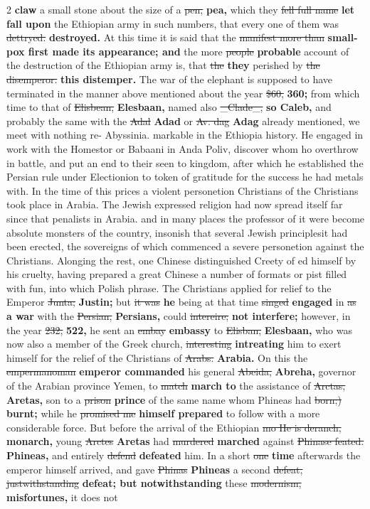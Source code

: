 \documentclass[10pt]{article}
\begin{document}
\begin{multicols}{2}
\textbf{claw} a small stone about the size of a \sout{pen,} \textbf{pea,} which they \sout{fell full name} \textbf{let fall upon} the Ethiopian army in such numbers, that every one of them was \sout{dettryed.} \textbf{destroyed.} At this time it is said that the \sout{manifest more than} \textbf{small-pox first made its appearance; and} the more \sout{people} \textbf{probable} account of the destruction of the Ethiopian army is, that \sout{the} \textbf{they} perished by \sout{the disemperor.} \textbf{this distemper.} The war of the elephant is supposed to have terminated in the manner above mentioned about the year \sout{\$60,} \textbf{360;} from which time to that of \sout{Elisbean,} \textbf{Elesbaan,} named also \sout{\_Clade\_,} \textbf{so Caleb,} and probably the same with the \sout{Adal} \textbf{Adad} or \sout{Av. dag} \textbf{Adag} already mentioned, we meet with nothing re- Abyssinia. markable in the Ethiopia history. He engaged in work with the Homestor or Babaani in Anda Poliv, discover whom ho overthrow in battle, and put an end to their seen to kingdom, after which he established the Persian rule under Electionion to token of gratitude for the success he had metals with. In the time of this prices a violent personetion Christians of the Christians took place in Arabia. The Jewish expressed religion had now spread itself far since that penalists in Arabia. and in many places the professor of it were become absolute monsters of the country, insonish that several Jewish principlesit had been erected, the sovereigns of which commenced a severe personetion against the Christians. Alonging the rest, one Chinese distinguished Creety of ed himself by his cruelty, having prepared a great Chinese a number of formats or pist filled with fun, into which Polish phrase. The Christians applied for relief to the Emperor \sout{Junta;} \textbf{Justin;} but \sout{it was} \textbf{he} being at that time \sout{singed} \textbf{engaged} in \sout{as} \textbf{a war} with the \sout{Persian,} \textbf{Persians,} could \sout{intereire;} \textbf{not interfere;} however, in the year \sout{232,} \textbf{522,} he sent an \sout{embay} \textbf{embassy} to \sout{Elisban,} \textbf{Elesbaan,} who was now also a member of the Greek church, \sout{interesting} \textbf{intreating} him to exert himself for the relief of the Christians of \sout{Arabs.} \textbf{Arabia.} On this the \sout{empermanoman} \textbf{emperor commanded} his general \sout{Abeida,} \textbf{Abreha,} governor of the Arabian province Yemen, to \sout{match} \textbf{march to} the assistance of \sout{Arctas,} \textbf{Aretas,} son to a \sout{prison} \textbf{prince} of the same name whom Phineas had \sout{born;)} \textbf{burnt;} while he \sout{promised me} \textbf{himself prepared} to follow with a more considerable force. But before the arrival of the Ethiopian \sout{mo He is deranch,} \textbf{monarch,} young \sout{Arctes} \textbf{Aretas} had \sout{murdered} \textbf{marched} against \sout{Phinase feated.} \textbf{Phineas,} and entirely \sout{defend} \textbf{defeated} him. In a short \sout{one} \textbf{time} afterwards the emperor himself arrived, and gave \sout{Phinas} \textbf{Phineas} a second \sout{defeat, justwithstanding} \textbf{defeat; but notwithstanding} these \sout{modernism,} \textbf{misfortunes,} it does not 
\end{multicols}
\end{document}
